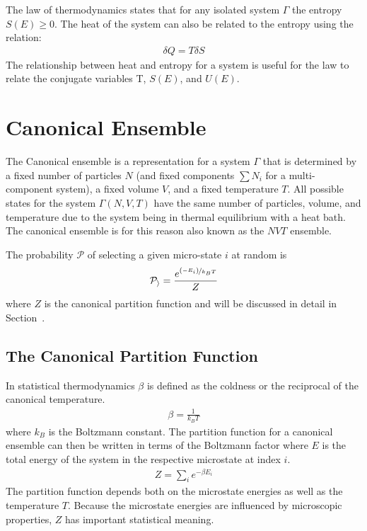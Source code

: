 The  law of thermodynamics states that for any isolated system $\Gamma$ the entropy $S(E) \geq 0$. The heat of the system can also be related to the entropy using the relation:
\begin{align}
    \delta Q = T\delta S
\end{align}
The relationship between heat and entropy for a system is useful for the  law to relate the conjugate variables T, $S(E)$, and $U(E)$.

\section{Canonical Ensemble}
The Canonical ensemble is a representation for a system $\Gamma$ that is
determined by a fixed number of particles $N$ (and fixed components $\sum N_i$
for a multi-component system), a fixed volume $V$, and a fixed temperature $T$.
All possible states for the system $\Gamma\left(N,V,T\right)$ have the same
number of particles, volume, and temperature due to the system being in thermal
equilibrium with a heat bath. The canonical ensemble is for this reason also
known as the $NVT$ ensemble.

The probability $\mathcal{P}$ of selecting a given micro-state $i$ at random is
\begin{align}
    \mathcal{P_i} = \frac{e^{\nicefrac{\left(-E_i\right)}{k_BT}}}{Z}
\end{align}
where $Z$ is the canonical partition function and will be discussed in detail in Section~.

\subsection{The Canonical Partition Function}\label{betaZ}
In statistical thermodynamics $\beta$ is defined as the coldness or the reciprocal of the canonical temperature.
\begin{align}
    \beta = \frac{1}{k_BT}
\end{align}
where $k_B$ is the Boltzmann constant. The partition function for a canonical ensemble can then be written in terms of the Boltzmann factor where $E$ is the total energy of the system in the respective microstate at index $i$.
\begin{align}
    Z = \sum_i e^{-\beta E_i}
\end{align}
The partition function depends both on the microstate energies as well as the
temperature $T$. Because the microstate energies are influenced by microscopic
properties, $Z$ has important statistical meaning.


